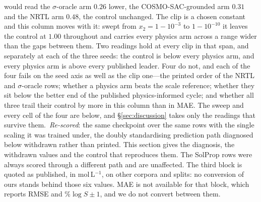 \begin{table}[tp]
{{would read the $\sigma$-oracle arm $0.26$ lower, the COSMO-SAC-grounded arm $0.31$ and the NRTL arm
$0.48$, the control unchanged. The clip is a chosen constant and this column moves with it: swept
from $x_2=1-10^{-3}$ to $1-10^{-10}$ it leaves the control at $1.00$ throughout and carries every
physics arm across a range wider than the gaps between them. Two
readings hold at every clip in that span, and separately at each of the three seeds: the control is
below every physics arm, and every physics arm is above every published
leader. Four do not, and each of the four fails on the seed axis as well as the clip one---the
printed order of the NRTL and $\sigma$-oracle rows; whether a physics arm beats the scale reference;
whether they sit below the better end of the published physics-informed cycle; and whether all three
trail their control by more in this column than in MAE. The sweep and every cell of the four are
below, and \S\ref{sec:discussion} takes only the readings that survive
them.\quad
{}\,\emph{Re-scored}: the same checkpoint over the same rows with the single scaling it was
trained under, the doubly standardising prediction path diagnosed below
withdrawn rather than printed. This section gives the diagnosis, the withdrawn values
and the control that reproduces them. The SolProp rows were always scored through a different path
and are unaffected.\quad
The third block is quoted as published, in mol\,L$^{-1}$, on other corpora and splits: no conversion
of ours stands behind those six values. MAE is not available for that block, which reports RMSE and
$\%\log S\pm1$, and we do not convert between them.}}
\end{table}

